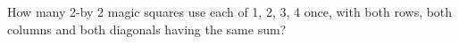 How many 2-by 2 magic squares use each of 1, 2, 3, 4 once, with both rows, both columns and both diagonals having the same sum?
